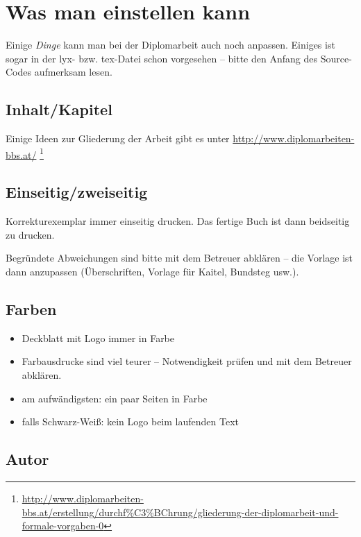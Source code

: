 \hypertarget{was-man-einstellen-kann}{%
\section{Was man einstellen kann}\label{was-man-einstellen-kann}}

Einige \emph{Dinge} kann man bei der Diplomarbeit auch noch anpassen.
Einiges ist sogar in der lyx- bzw. tex-Datei schon vorgesehen -- bitte
den Anfang des Source-Codes aufmerksam lesen.

\hypertarget{inhaltkapitel}{%
\subsection{Inhalt/Kapitel}\label{inhaltkapitel}}

Einige Ideen zur Gliederung der Arbeit gibt es unter
\url{http://www.diplomarbeiten-bbs.at/} \footnote{\url{http://www.diplomarbeiten-bbs.at/erstellung/durchf\%C3\%BChrung/gliederung-der-diplomarbeit-und-formale-vorgaben-0}}

\hypertarget{einseitigzweiseitig}{%
\subsection{Einseitig/zweiseitig}\label{einseitigzweiseitig}}

Korrekturexemplar immer einseitig drucken. Das fertige Buch ist dann
beidseitig zu drucken.

Begründete Abweichungen sind bitte mit dem Betreuer abklären -- die
Vorlage ist dann anzupassen (Überschriften, Vorlage für Kaitel, Bundsteg
usw.).

\hypertarget{farben}{%
\subsection{Farben}\label{farben}}

\begin{itemize}
\tightlist
\item
  Deckblatt mit Logo immer in Farbe
\item
  Farbausdrucke sind viel teurer -- Notwendigkeit prüfen und mit dem
  Betreuer abklären.
\item
  am aufwändigsten: ein paar Seiten in Farbe
\item
  falls Schwarz-Weiß: kein Logo beim laufenden Text
\end{itemize}

\hypertarget{autor}{%
\subsection{Autor}\label{autor}}

